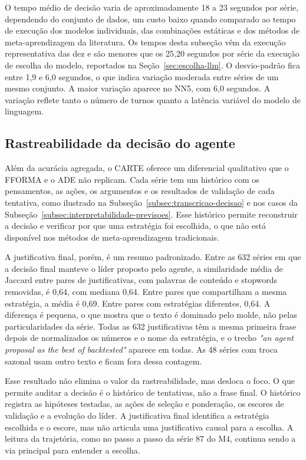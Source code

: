 O tempo médio de decisão varia de aproximadamente 18 a 23 segundos por série, dependendo do conjunto de dados, um custo baixo quando comparado ao tempo de execução dos modelos individuais, das combinações estáticas e dos métodos de meta-aprendizagem da literatura. Os tempos desta subseção vêm da execução representativa das dez e são menores que os 25,20 segundos por série da execução de escolha do modelo, reportados na Seção~\ref{sec:escolha-llm}. O desvio-padrão fica entre 1,9 e 6,0 segundos, o que indica variação moderada entre séries de um mesmo conjunto. A maior variação aparece no NN5, com 6,0 segundos. A variação reflete tanto o número de turnos quanto a latência variável do modelo de linguagem.
\subsection{Rastreabilidade da decisão do agente} \label{subsec:rastreabilidade}

Além da acurácia agregada, o CARTE oferece um diferencial qualitativo que o FFORMA e o ADE não replicam. Cada série tem um histórico com os pensamentos, as ações, os argumentos e os resultados de validação de cada tentativa, como ilustrado na Subseção~\ref{subsec:transcricao-decisao} e nos casos da Subseção~\ref{subsec:interpretabilidade-previsoes}. Esse histórico permite reconstruir a decisão e verificar por que uma estratégia foi escolhida, o que não está disponível nos métodos de meta-aprendizagem tradicionais.

A justificativa final, porém, é um resumo padronizado. Entre as 632 séries em que a decisão final manteve o líder proposto pelo agente, a similaridade média de Jaccard entre pares de justificativas, com palavras de conteúdo e stopwords removidas, é 0,64, com mediana 0,64. Entre pares que compartilham a mesma estratégia, a média é 0,69. Entre pares com estratégias diferentes, 0,64. A diferença é pequena, o que mostra que o texto é dominado pelo molde, não pelas particularidades da série. Todas as 632 justificativas têm a mesma primeira frase depois de normalizados os números e o nome da estratégia, e o trecho \textit{"an agent proposal as the best of backtested"} aparece em todas. As 48 séries com troca sazonal usam outro texto e ficam fora dessa contagem.

Esse resultado não elimina o valor da rastreabilidade, mas desloca o foco. O que permite auditar a decisão é o histórico de tentativas, não a frase final. O histórico registra as hipóteses testadas, as ações de seleção e ponderação, os escores de validação e a evolução do líder. A justificativa final identifica a estratégia escolhida e o escore, mas não articula uma justificativa causal para a escolha. A leitura da trajetória, como no passo a passo da série 87 do M4, continua sendo a via principal para entender a escolha.


